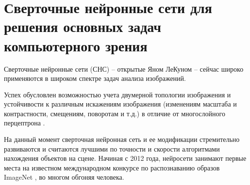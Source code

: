 \section{Сверточные нейронные сети для решения основных задач компьютерного зрения}

Сверточные нейронные сети (СНС) -- открытые Яном ЛеКуном \cite{lib-lecun-cnn} -- сейчас широко применяются в широком спектре задач анализа изображений.

Успех обусловлен возможностью учета двумерной топологии изображения и устойчивости к различным искажениям изображения (изменениям масштаба и контрастности, смещениям, поворотам и т.д.) в отличие от многослойного перцептрона \cite{lib-perciptrone}.

На данный момент сверточная нейронная сеть и ее модификации стремительно развиваются и считаются лучшими по точности и скорости алгоритмами нахождения объектов на сцене. Начиная с 2012 года, нейросети занимают первые места на известном международном конкурсе по распознаванию образов ImageNet \cite{lib-imagenet}, во многом обгоняя человека.




\clearpage